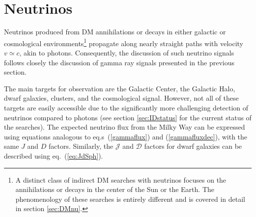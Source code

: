 \section{Neutrinos}
\label{sec:neutrinosID}

Neutrinos produced from DM annihilations or decays in either galactic or cosmological environments\footnote{A distinct class of indirect DM searches with neutrinos focuses on the annihilations or decays in the center of the Sun or the Earth. The phenomenology of these searches is entirely different and is covered in detail in section \ref{sec:DMnu}.} 
propagate along nearly straight paths with velocity $v \simeq c$, akin to photons.
Consequently, the discussion of such neutrino signals follows closely 
the discussion of gamma ray signals presented in the previous section. 





The main targets for observation are the Galactic Center, the Galactic Halo, dwarf galaxies, clusters, and the cosmological signal. 
However, not all of these targets are easily accessible due to the significantly more challenging detection of neutrinos compared to photons (see section \ref{sec:IDstatus} for the current status of the searches).
The expected neutrino flux from the Milky Way
can be expressed using equations analogous to eq.s~(\ref{gammaflux}) and (\ref{gammafluxdec}), 
with the same $J$ and $D$ factors. 
Similarly, the ${\mathcal J}$ and ${\mathcal D}$ factors for dwarf galaxies can be described using eq.~(\ref{eq:JdSph}).


\medskip


